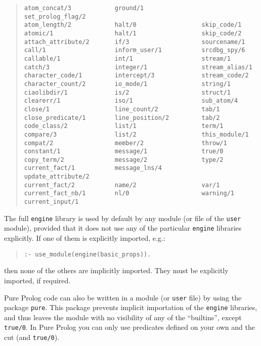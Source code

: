 \begin{quote}
\begin{verbatim}
atom_concat/3            ground/1                set_prolog_flag/2    
atom_length/2            halt/0                  skip_code/1          
atomic/1                 halt/1                  skip_code/2          
attach_attribute/2       if/3                    sourcename/1         
call/1                   inform_user/1           srcdbg_spy/6         
callable/1               int/1                   stream/1             
catch/3                  integer/1               stream_alias/1       
character_code/1         intercept/3             stream_code/2        
character_count/2        io_mode/1               string/1             
ciaolibdir/1             is/2                    struct/1             
clearerr/1               iso/1                   sub_atom/4           
close/1                  line_count/2            tab/1                
close_predicate/1        line_position/2         tab/2                
code_class/2             list/1                  term/1               
compare/3                list/2                  this_module/1        
compat/2                 member/2                throw/1              
constant/1               message/1               true/0               
copy_term/2              message/2               type/2               
current_fact/1           message_lns/4           update_attribute/2   
current_fact/2           name/2                  var/1                
current_fact_nb/1        nl/0                    warning/1            
current_input/1                
\end{verbatim}
\end{quote}

The full \verb+engine+ library is used by default by any module (or file of
the \verb+user+ module), provided that it does not use any of the
particular \verb+engine+ libraries explicitly. If one of them is
explicitly imported, e.g.:
\begin{quote}
\begin{verbatim}
:- use_module(engine(basic_props)).
\end{verbatim}
\end{quote}
%
then none of the others are implicitly imported. They must be
explicitly imported, if required.

Pure Prolog code can also be written in a module (or \verb+user+ file)
by using the package \verb+pure+. This package prevents implicit
importation of the \verb+engine+ libraries, and thus leaves the module
with no visibility of any of the ``builtins'', except
\verb+true/0+. In Pure Prolog you can only use predicates defined on
your own and the cut (and \verb+true/0+).

